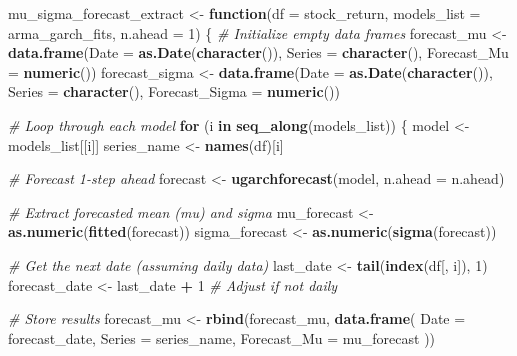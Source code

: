 \documentclass[
]{article}
\newenvironment{Shaded}{\begin{snugshade}}{\end{snugshade}}
\newcommand{\AttributeTok}[1]{\textcolor[rgb]{0.13,0.29,0.53}{#1}}
\newcommand{\CommentTok}[1]{\textcolor[rgb]{0.56,0.35,0.01}{\textit{#1}}}
\newcommand{\ControlFlowTok}[1]{\textcolor[rgb]{0.13,0.29,0.53}{\textbf{#1}}}
\newcommand{\DecValTok}[1]{\textcolor[rgb]{0.00,0.00,0.81}{#1}}
\newcommand{\FunctionTok}[1]{\textcolor[rgb]{0.13,0.29,0.53}{\textbf{#1}}}
\newcommand{\NormalTok}[1]{#1}
\newcommand{\OtherTok}[1]{\textcolor[rgb]{0.56,0.35,0.01}{#1}}
\newcommand{\SpecialCharTok}[1]{\textcolor[rgb]{0.81,0.36,0.00}{\textbf{#1}}}
\begin{document}
\begin{Shaded}
\begin{Highlighting}[]
\NormalTok{mu\_sigma\_forecast\_extract }\OtherTok{\textless{}{-}} \ControlFlowTok{function}\NormalTok{(}\AttributeTok{df =}\NormalTok{ stock\_return, }\AttributeTok{models\_list =}\NormalTok{ arma\_garch\_fits, }\AttributeTok{n.ahead =} \DecValTok{1}\NormalTok{) \{}
  \CommentTok{\# Initialize empty data frames}
\NormalTok{  forecast\_mu }\OtherTok{\textless{}{-}} \FunctionTok{data.frame}\NormalTok{(}\AttributeTok{Date =} \FunctionTok{as.Date}\NormalTok{(}\FunctionTok{character}\NormalTok{()), }\AttributeTok{Series =} \FunctionTok{character}\NormalTok{(), }\AttributeTok{Forecast\_Mu =} \FunctionTok{numeric}\NormalTok{())}
\NormalTok{  forecast\_sigma }\OtherTok{\textless{}{-}} \FunctionTok{data.frame}\NormalTok{(}\AttributeTok{Date =} \FunctionTok{as.Date}\NormalTok{(}\FunctionTok{character}\NormalTok{()), }\AttributeTok{Series =} \FunctionTok{character}\NormalTok{(), }\AttributeTok{Forecast\_Sigma =} \FunctionTok{numeric}\NormalTok{())}
  
  \CommentTok{\# Loop through each model}
  \ControlFlowTok{for}\NormalTok{ (i }\ControlFlowTok{in} \FunctionTok{seq\_along}\NormalTok{(models\_list)) \{}
\NormalTok{    model }\OtherTok{\textless{}{-}}\NormalTok{ models\_list[[i]]}
\NormalTok{    series\_name }\OtherTok{\textless{}{-}} \FunctionTok{names}\NormalTok{(df)[i]}
    
    \CommentTok{\# Forecast 1{-}step ahead}
\NormalTok{    forecast }\OtherTok{\textless{}{-}} \FunctionTok{ugarchforecast}\NormalTok{(model, }\AttributeTok{n.ahead =}\NormalTok{ n.ahead)}
    
    \CommentTok{\# Extract forecasted mean (mu) and sigma}
\NormalTok{    mu\_forecast }\OtherTok{\textless{}{-}} \FunctionTok{as.numeric}\NormalTok{(}\FunctionTok{fitted}\NormalTok{(forecast))}
\NormalTok{    sigma\_forecast }\OtherTok{\textless{}{-}} \FunctionTok{as.numeric}\NormalTok{(}\FunctionTok{sigma}\NormalTok{(forecast))}
    
    \CommentTok{\# Get the next date (assuming daily data)}
\NormalTok{    last\_date }\OtherTok{\textless{}{-}} \FunctionTok{tail}\NormalTok{(}\FunctionTok{index}\NormalTok{(df[, i]), }\DecValTok{1}\NormalTok{)}
\NormalTok{    forecast\_date }\OtherTok{\textless{}{-}}\NormalTok{ last\_date }\SpecialCharTok{+} \DecValTok{1}  \CommentTok{\# Adjust if not daily}
    
    \CommentTok{\# Store results}
\NormalTok{    forecast\_mu }\OtherTok{\textless{}{-}} \FunctionTok{rbind}\NormalTok{(forecast\_mu, }\FunctionTok{data.frame}\NormalTok{(}
      \AttributeTok{Date =}\NormalTok{ forecast\_date,}
      \AttributeTok{Series =}\NormalTok{ series\_name,}
      \AttributeTok{Forecast\_Mu =}\NormalTok{ mu\_forecast}
\NormalTok{    ))}
    

\end{Highlighting}
\end{Shaded}
\end{document}
